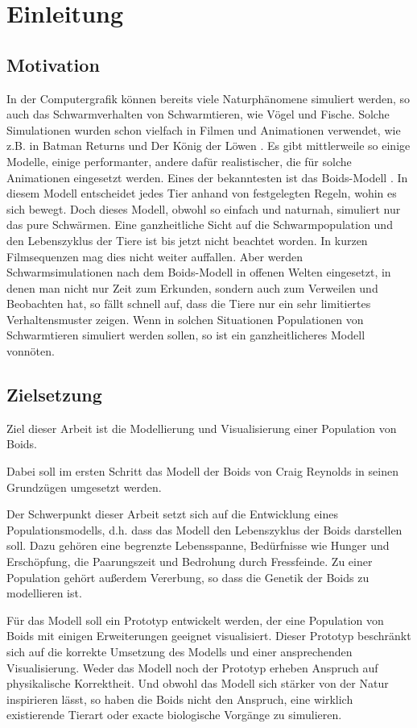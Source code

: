 \documentclass[draft=false
              ,paper=a4
              ,twoside=false
              ,fontsize=11pt
              ,headsepline
              ,BCOR10mm
              ,DIV11
              ,bibtotoc
              ,liststotoc
              ]{scrbook}
\begin{document}
\chapter{Einleitung}\label{einleitung}
\section{Motivation}
In der Computergrafik können bereits viele Naturphänomene simuliert werden, so auch das Schwarmverhalten von Schwarmtieren, wie Vögel und Fische.
Solche Simulationen wurden schon vielfach in Filmen und Animationen verwendet, wie z.B. in Batman Returns und Der König der Löwen \cite{movies}. Es gibt mittlerweile so einige Modelle, einige performanter, andere dafür realistischer, die für solche Animationen eingesetzt werden. Eines der bekanntesten ist das Boids-Modell \cite{reynolds87}. In diesem Modell entscheidet jedes Tier anhand von festgelegten Regeln, wohin es sich bewegt. Doch dieses Modell, obwohl so einfach und naturnah, simuliert nur das pure Schwärmen. Eine ganzheitliche Sicht auf die Schwarmpopulation und den Lebenszyklus der Tiere ist bis jetzt nicht beachtet worden. In kurzen Filmsequenzen mag dies nicht weiter auffallen. Aber werden Schwarmsimulationen nach dem Boids-Modell in offenen Welten eingesetzt, in denen man nicht nur Zeit zum Erkunden, sondern auch zum Verweilen und Beobachten hat, so fällt schnell auf, dass die Tiere nur ein sehr limitiertes Verhaltensmuster zeigen.
Wenn in solchen Situationen Populationen von Schwarmtieren simuliert werden sollen, so ist ein ganzheitlicheres Modell vonnöten.

\section{Zielsetzung}
Ziel dieser Arbeit ist die Modellierung und Visualisierung einer Population von Boids.

Dabei soll im ersten Schritt das Modell der Boids von Craig Reynolds \cite{reynolds87} in seinen Grundzügen umgesetzt werden.

Der Schwerpunkt dieser Arbeit setzt sich auf die Entwicklung eines Populationsmodells, d.h. dass das Modell den Lebenszyklus der Boids darstellen soll. Dazu gehören eine begrenzte Lebensspanne, Bedürfnisse wie Hunger und Erschöpfung, die Paarungszeit und Bedrohung durch Fressfeinde.
Zu einer Population gehört außerdem Vererbung, so dass die Genetik der Boids zu modellieren ist.

Für das Modell soll ein Prototyp entwickelt werden, der eine Population von Boids mit einigen Erweiterungen geeignet visualisiert.
Dieser Prototyp beschränkt sich auf die korrekte Umsetzung des Modells und einer ansprechenden Visualisierung. Weder das Modell noch der Prototyp erheben Anspruch auf physikalische Korrektheit. Und obwohl das Modell sich stärker von der Natur inspirieren lässt, so haben die Boids nicht den Anspruch, eine wirklich existierende Tierart oder exacte biologische Vorgänge zu simulieren.
\end{document}
